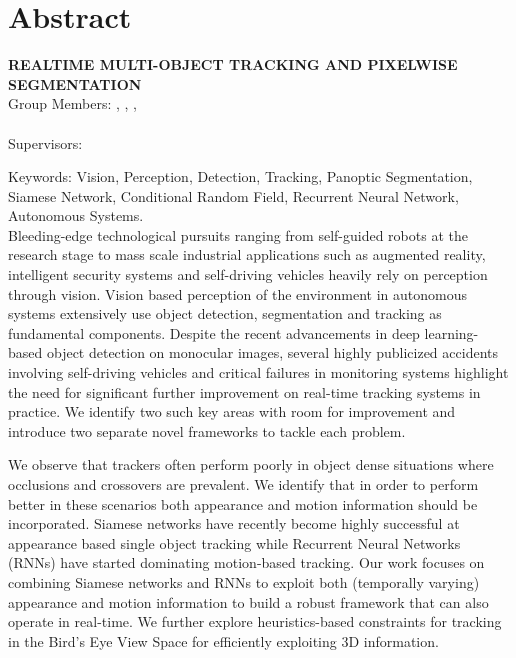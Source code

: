 \chapter*{Abstract}

\begin{center}
	\vspace{5mm}
	\MakeUppercase{\textbf{Realtime Multi-Object Tracking and Pixelwise Segmentation}}\\
	\vspace{5mm}
	Group Members: \memberA, \memberB, \memberC, \\ \memberD \\
	\vspace{5mm}
	Supervisors: \supervisorA %
	\vspace{5mm}
\end{center}

\noindent Keywords: Vision, Perception, Detection, Tracking, Panoptic Segmentation, Siamese Network, Conditional Random Field, Recurrent Neural Network, Autonomous Systems. \\

Bleeding-edge technological pursuits ranging from self-guided robots at the research stage to mass scale industrial applications such as augmented reality, intelligent security systems and self-driving vehicles heavily rely on perception through vision. Vision based perception of the environment in autonomous systems extensively use object detection, segmentation and tracking as fundamental components. Despite the recent advancements in deep learning-based object detection on monocular images, several highly publicized accidents involving self-driving vehicles and critical failures in monitoring systems highlight the need for significant further improvement on real-time tracking systems in practice. We identify two such key areas with room for improvement and introduce two separate novel frameworks to tackle each problem. 

We observe that trackers often perform poorly in object dense situations where occlusions and crossovers are prevalent. We identify that in order to perform better in these scenarios both appearance and motion information should be incorporated. Siamese networks have recently become highly successful at appearance based single object tracking while Recurrent Neural Networks (RNNs) have started dominating motion-based tracking. Our work focuses on combining Siamese networks and RNNs to exploit both (temporally varying) appearance and motion information to build a robust framework that can also operate in real-time. We further explore heuristics-based constraints for tracking in the Bird’s Eye View Space for efficiently exploiting 3D information.

